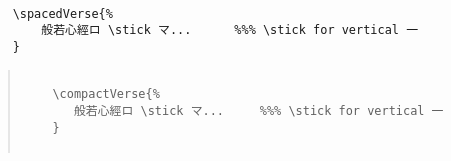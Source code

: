 \documentclass[letterpaper]{article}
\begin{document}
\begin{verbatim}

	\spacedVerse{%
		般若心經ロ \stick マ...      %%% \stick for vertical 一
	}

\end{verbatim}

\pagebreak

\vspace*{2cm}

\renewcommand{\kanji}{\centering\fontsize{25}{25}}
\begin{multicols}{7}
	\RLmulticolcolumns
\end{multicols}

\vspace*{1cm}

\begin{quotation}
	
	\begin{verbatim}
	
	\compactVerse{%
	   般若心經ロ \stick マ...     %%% \stick for vertical 一 
	}
	
	\end{verbatim}
	
\end{quotation}
\end{document}
